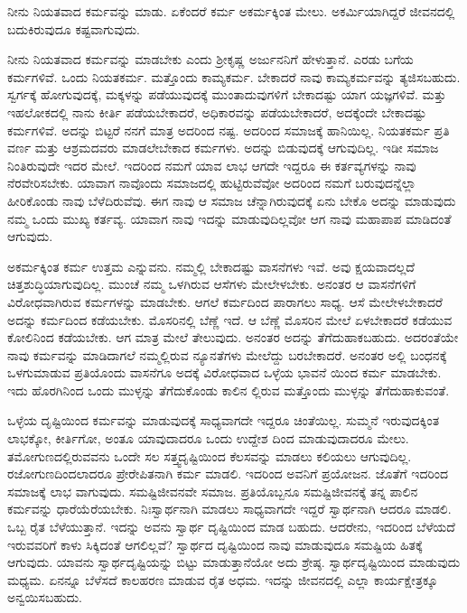 {\small ನೀನು ನಿಯತವಾದ ಕರ್ಮವನ್ನು ಮಾಡು. ಏಕೆಂದರೆ ಕರ್ಮ ಅಕರ್ಮಕ್ಕಿಂತ ಮೇಲು. ಅಕರ್ಮಿಯಾಗಿದ್ದರೆ ಜೀವನದಲ್ಲಿ ಬದುಕಿರುವುದೂ ಕಷ್ಟವಾಗುವುದು.}

ನೀನು ನಿಯತವಾದ ಕರ್ಮವನ್ನು ಮಾಡಬೇಕು ಎಂದು ಶ್ರೀಕೃಷ್ಣ ಅರ್ಜುನನಿಗೆ ಹೇಳುತ್ತಾನೆ. ಎರಡು ಬಗೆಯ ಕರ್ಮಗಳಿವೆ. ಒಂದು ನಿಯತಕರ್ಮ. ಮತ್ತೊಂದು ಕಾಮ್ಯಕರ್ಮ. ಬೇಕಾದರೆ ನಾವು ಕಾಮ್ಯಕರ್ಮವನ್ನು ತ್ಯಜಿಸಬಹುದು. ಸ್ವರ್ಗಕ್ಕೆ ಹೋಗುವುದಕ್ಕೆ, ಮಕ್ಕಳನ್ನು ಪಡೆಯುವುದಕ್ಕೆ ಮುಂತಾದುವುಗಳಿಗೆ ಬೇಕಾದಷ್ಟು ಯಾಗ ಯಜ್ಞಗಳಿವೆ. ಮತ್ತು ಇಹಲೋಕದಲ್ಲಿ ನಾನು ಕೀರ್ತಿ ಪಡೆಯಬೇಕಾದರೆ, ಅಧಿಕಾರವನ್ನು ಪಡೆಯಬೇಕಾದರೆ, ಅದಕ್ಕೆಂದೇ ಬೇಕಾದಷ್ಟು ಕರ್ಮಗಳಿವೆ. ಅದನ್ನು ಬಿಟ್ಟರೆ ನನಗೆ ಮಾತ್ರ ಅದರಿಂದ ನಷ್ಟ. ಅದರಿಂದ ಸಮಾಜಕ್ಕೆ ಹಾನಿಯಿಲ್ಲ. ನಿಯತಕರ್ಮ ಪ್ರತಿ ವರ್ಣ ಮತ್ತು ಆಶ್ರಮದವರು ಮಾಡಲೇಬೇಕಾದ ಕರ್ಮಗಳು. ಅದನ್ನು ಬಿಡುವುದಕ್ಕೆ ಆಗುವುದಿಲ್ಲ. ಇಡೀ ಸಮಾಜ ನಿಂತಿರುವುದೇ ಇದರ ಮೇಲೆ. ಇದರಿಂದ ನಮಗೆ ಯಾವ ಲಾಭ ಆಗದೇ ಇದ್ದರೂ ಈ ಕರ್ತವ್ಯಗಳನ್ನು ನಾವು ನೆರವೇರಿಸಬೇಕು. ಯಾವಾಗ ನಾವೊಂದು ಸಮಾಜದಲ್ಲಿ ಹುಟ್ಟಿರುವೆವೋ ಅದರಿಂದ ನಮಗೆ ಬರುವುದನ್ನೆಲ್ಲಾ ಹೀರಿಕೊಂಡು ನಾವು ಬೆಳೆದಿರುವೆವು. ಈಗ ನಾವು ಆ ಸಮಾಜ ಚೆನ್ನಾಗಿರುವುದಕ್ಕೆ ಏನು ಬೇಕೊ ಅದನ್ನು ಮಾಡುವುದು ನಮ್ಮ ಒಂದು ಮುಖ್ಯ ಕರ್ತವ್ಯ. ಯಾವಾಗ ನಾವು ಇದನ್ನು ಮಾಡುವುದಿಲ್ಲವೋ ಆಗ ನಾವು ಮಹಾಪಾಪ ಮಾಡಿದಂತೆ ಆಗುವುದು.

ಅಕರ್ಮಕ್ಕಿಂತ ಕರ್ಮ ಉತ್ತಮ ಎನ್ನುವನು. ನಮ್ಮಲ್ಲಿ ಬೇಕಾದಷ್ಟು ವಾಸನೆಗಳು ಇವೆ. ಅವು ಕ್ಷಯವಾದಲ್ಲದೆ ಚಿತ್ತಶುದ್ಧಿಯಾಗುವುದಿಲ್ಲ. ಮುಂಚೆ ನಮ್ಮ ಒಳಗಿರುವ ಆಸೆಗಳು ಮೇಲೇಳಬೇಕು. ಅನಂತರ ಆ ವಾಸನೆಗಳಿಗೆ ವಿರೋಧವಾಗಿರುವ ಕರ್ಮಗಳನ್ನು ಮಾಡಬೇಕು. ಆಗಲೆ ಕರ್ಮದಿಂದ ಪಾರಾಗಲು ಸಾಧ್ಯ. ಆಸೆ ಮೇಲೇಳಬೇಕಾದರೆ ಅದನ್ನು ಕರ್ಮದಿಂದ ಕಡೆಯಬೇಕು. ಮೊಸರಿನಲ್ಲಿ ಬೆಣ್ಣೆ ಇದೆ. ಆ ಬೆಣ್ಣೆ ಮೊಸರಿನ ಮೇಲೆ ಏಳಬೇಕಾದರೆ ಕಡೆಯುವ ಕೋಲಿನಿಂದ ಕಡೆಯಬೇಕು. ಆಗ ಮಾತ್ರ ಮೇಲೆ ತೇಲುವುದು. ಅನಂತರ ಅದನ್ನು ತೆಗೆದುಹಾಕಬಹುದು. ಅದರಂತೆಯೇ ನಾವು ಕರ್ಮವನ್ನು ಮಾಡಿದಾಗಲೆ ನಮ್ಮಲ್ಲಿರುವ ನ್ಯೂನತೆಗಳು ಮೇಲೆದ್ದು ಬರಬೇಕಾದರೆ. ಅನಂತರ ಅಲ್ಲಿ ಬಂಧನಕ್ಕೆ ಒಳಗುಮಾಡುವ ಪ್ರತಿಯೊಂದು ವಾಸನೆಗೂ ಅದಕ್ಕೆ ವಿರೋಧವಾದ ಒಳ್ಳೆಯ ಭಾವನೆ ಯಿಂದ ಕರ್ಮ ಮಾಡಬೇಕು. ಇದು ಹೊರಗಿನಿಂದ ಒಂದು ಮುಳ್ಳನ್ನು ತೆಗೆದುಕೊಂಡು ಕಾಲಿನ ಲ್ಲಿರುವ ಮತ್ತೊಂದು ಮುಳ್ಳನ್ನು ತೆಗೆದುಹಾಕುವಂತೆ.

ಒಳ್ಳೆಯ ದೃಷ್ಟಿಯಿಂದ ಕರ್ಮವನ್ನು ಮಾಡುವುದಕ್ಕೆ ಸಾಧ್ಯವಾಗದೇ ಇದ್ದರೂ ಚಿಂತೆಯಿಲ್ಲ. ಸುಮ್ಮನೆ ಇರುವುದಕ್ಕಿಂತ ಲಾಭಕ್ಕೋ, ಕೀರ್ತಿಗೋ, ಅಂತೂ ಯಾವುದಾದರೂ ಒಂದು ಉದ್ದೇಶ ದಿಂದ ಮಾಡುವುದಾದರೂ ಮೇಲು. ತಮೋಗುಣದಲ್ಲಿರುವವನು ಒಂದೇ ಸಲ ಸತ್ತ್ವದೃಷ್ಟಿಯಿಂದ ಕೆಲಸವನ್ನು ಮಾಡಲು ಕಲಿಯಲು ಆಗುವುದಿಲ್ಲ. ರಜೋಗುಣದಿಂದಲಾದರೂ ಪ್ರೇರೇಪಿತನಾಗಿ ಕರ್ಮ ಮಾಡಲಿ. ಇದರಿಂದ ಅವನಿಗೆ ಪ್ರಯೋಜನ. ಜೊತೆಗೆ ಇದರಿಂದ ಸಮಾಜಕ್ಕೆ ಲಾಭ ವಾಗುವುದು. ಸಮಷ್ಟಿಜೀವನವೇ ಸಮಾಜ. ಪ್ರತಿಯೊಬ್ಬನೂ ಸಮಷ್ಟಿಜೀವನಕ್ಕೆ ತನ್ನ ಪಾಲಿನ ಕರ್ಮವನ್ನು ಧಾರೆಯೆರೆಯಬೇಕು. ನಿಃಸ್ವಾರ್ಥನಾಗಿ ಮಾಡಲು ಸಾಧ್ಯವಾಗದೇ ಇದ್ದರೆ ಸ್ವಾರ್ಥನಾಗಿ ಆದರೂ ಮಾಡಲಿ. ಒಬ್ಬ ರೈತ ಬೆಳೆಯುತ್ತಾನೆ. ಇದನ್ನು ಅವನು ಸ್ವಾರ್ಥ ದೃಷ್ಟಿಯಿಂದ ಮಾಡ ಬಹುದು. ಆದರೇನು, ಇದರಿಂದ ಬೆಳೆಯದೆ ಇರುವವರಿಗೆ ಕಾಳು ಸಿಕ್ಕಿದಂತೆ ಆಗಲಿಲ್ಲವೆ? ಸ್ವಾರ್ಥದ ದೃಷ್ಟಿಯಿಂದ ನಾವು ಮಾಡುವುದೂ ಸಮಷ್ಟಿಯ ಹಿತಕ್ಕೆ ಆಗುವುದು. ಯಾವನು ಸ್ವಾರ್ಥದೃಷ್ಟಿಯನ್ನು ಬಿಟ್ಟು ಮಾಡುತ್ತಾನೆಯೋ ಅದು ಶ್ರೇಷ್ಠ. ಸ್ವಾರ್ಥದೃಷ್ಟಿಯಿಂದ ಮಾಡುವುದು ಮಧ್ಯಮ. ಏನನ್ನೂ ಬೆಳೆಸದೆ ಕಾಲಹರಣ ಮಾಡುವ ರೈತ ಅಧಮ. ಇದನ್ನು ಜೀವನದಲ್ಲಿ ಎಲ್ಲಾ ಕಾರ್ಯಕ್ಷೇತ್ರಕ್ಕೂ ಅನ್ವಯಿಸಬಹುದು.

